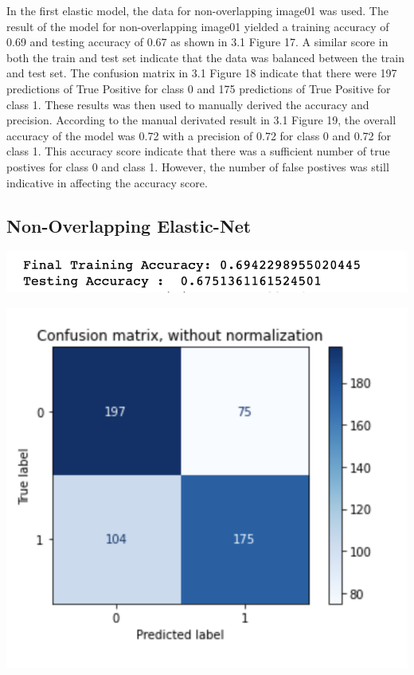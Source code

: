 \documentclass[12pt]{article}
\begin{document}
\begin{multicols*}{2}
  \hspace*{5mm} In the first elastic model, the data for non-overlapping image01 was used. The result of the model for
  non-overlapping image01 yielded a training accuracy of 0.69 and testing accuracy of 0.67 as shown in 3.1 Figure 17. A similar 
  score in both the train and test set indicate that the data was balanced between the train and test set. The confusion matrix in 3.1 
  Figure 18 indicate that there were 197 predictions of True Positive for class 0 and 175 predictions of True Positive for class 1. These
  results was then used to manually derived the accuracy and precision. According to the manual derivated result in 3.1 Figure 19, the overall
  accuracy of the model was 0.72 with a precision of 0.72 for class 0 and 0.72 for class 1. This accuracy score indicate that there was a sufficient
  number of true postives for class 0 and class 1. However, the number of false postives was still indicative in affecting the accuracy score.

  \subsection{Non-Overlapping Elastic-Net} 
  \begin{center}
		\includegraphics[scale=0.5]{../screenshot/Non-Overlapping-Elastic-results/results.png}

		\includegraphics[scale=0.5]{../screenshot/Non-Overlapping-Elastic-results/cf.png}


\end{center}
\end{multicols*}
\end{document}
